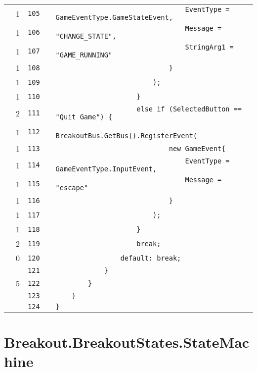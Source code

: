 \documentclass[a4paper,landscape,10pt]{article}
\begin{document}
\begin{longtable}[l]{lrrll}
\cellcolor{green} & 1 & \verb~105~ & & \verb~                                EventType = GameEventType.GameStateEvent,~\\
\cellcolor{green} & 1 & \verb~106~ & & \verb~                                Message = "CHANGE_STATE",~\\
\cellcolor{green} & 1 & \verb~107~ & & \verb~                                StringArg1 = "GAME_RUNNING"~\\
\cellcolor{green} & 1 & \verb~108~ & & \verb~                            }~\\
\cellcolor{green} & 1 & \verb~109~ & & \verb~                        );~\\
\cellcolor{green} & 1 & \verb~110~ & & \verb~                    }~\\
\cellcolor{green} & 2 & \verb~111~ & & \verb~                    else if (SelectedButton == "Quit Game") {~\\
\cellcolor{green} & 1 & \verb~112~ & & \verb~                        BreakoutBus.GetBus().RegisterEvent(~\\
\cellcolor{green} & 1 & \verb~113~ & & \verb~                            new GameEvent{~\\
\cellcolor{green} & 1 & \verb~114~ & & \verb~                                EventType = GameEventType.InputEvent,~\\
\cellcolor{green} & 1 & \verb~115~ & & \verb~                                Message = "escape"~\\
\cellcolor{green} & 1 & \verb~116~ & & \verb~                            }~\\
\cellcolor{green} & 1 & \verb~117~ & & \verb~                        );~\\
\cellcolor{green} & 1 & \verb~118~ & & \verb~                    }~\\
\cellcolor{green} & 2 & \verb~119~ & & \verb~                    break;~\\
\cellcolor{red} & 0 & \verb~120~ & & \verb~                default: break;~\\
\cellcolor{gray} &  & \verb~121~ & & \verb~            }~\\
\cellcolor{green} & 5 & \verb~122~ & & \verb~        }~\\
\cellcolor{gray} &  & \verb~123~ & & \verb~    }~\\
\cellcolor{gray} &  & \verb~124~ & & \verb~}~\\
\end{longtable}
\newpage
\section{Breakout.BreakoutStates.StateMachine}
\end{document}
